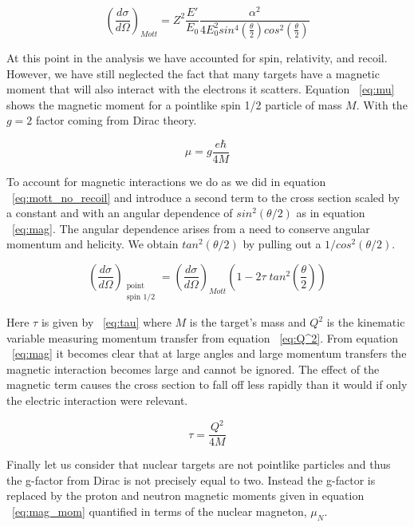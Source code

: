 \begin{equation} \label{eq:mott}
\left(\frac{d\sigma}{d\Omega}\right)_{Mott} = Z^2 \frac{E'}{E_0} \frac{\alpha^2}{4E_0^2 sin^4\left( \frac{\theta}{2} \right) cos^2\left( \frac{\theta}{2} \right)}
\end{equation}

At this point in the analysis we have accounted for spin, relativity, and recoil. However, we have still neglected the fact that many targets have a magnetic moment that will also interact with the electrons it scatters. Equation ~\ref{eq:mu} shows the magnetic moment for a pointlike spin 1/2 particle of mass $M$. With the $g=2$ factor coming from Dirac theory.  

\begin{equation} \label{eq:mu}
\mu = g \frac{e\hbar}{4M}
\end{equation}

To account for magnetic interactions we do as we did in equation ~\ref{eq:mott_no_recoil} and introduce a second term to the cross section scaled by a constant and with an angular dependence of $sin^2(\theta/2)$ as in equation ~\ref{eq:mag}. The angular dependence arises from a need to conserve angular momentum and helicity. We obtain $tan^2(\theta/2)$ by pulling out a $1/cos^2(\theta/2)$.

\begin{equation} \label{eq:mag}
\left(\frac{d\sigma}{d\Omega}\right)_{\substack{ \text{point} \\ \text{spin 1/2}}} = \left( \frac{d\sigma}{d\Omega} \right)_{Mott} (1-2\tau \; tan^2\left( \frac{\theta}{2} \right))
\end{equation}

\noindent Here $\tau$ is given by ~\ref{eq:tau} where $M$ is the target's mass and $Q^2$ is the kinematic variable measuring momentum transfer from equation ~\ref{eq:Q^2}. From equation ~\ref{eq:mag} it becomes clear that at large angles and large momentum transfers the magnetic interaction becomes large and cannot be ignored. The effect of the magnetic term causes the cross section to fall off less rapidly than it would if only the electric interaction were relevant.

\begin{equation} \label{eq:tau}
\tau = \frac{Q^2}{4M}
\end{equation}

Finally let us consider that nuclear targets are not pointlike particles and thus the g-factor from Dirac is not precisely equal to two. Instead the g-factor is replaced by the proton and neutron magnetic moments given in equation ~\ref{eq:mag_mom} quantified in terms of the nuclear magneton, $\mu_N$.

